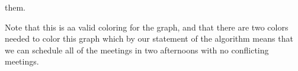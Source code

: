 them.
\\
\begin{center}
\end{center}
%
Note that this is aa valid coloring for the graph, and that there are two colors
needed to color this graph which by our statement of the algorithm means that we
can schedule all of the meetings in two afternoons with no conflicting meetings.
